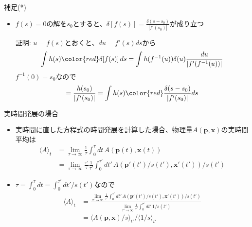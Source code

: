 \begin{frame}[t,fragile]{補足(*)}
  \begin{itemize}
  \item $f(s)=0$の解を$s_0$とすると、$\displaystyle \delta [f(s)] = \frac{\delta(s-s_0)}{|f'(s_0)|}$が成り立つ

    証明: $u=f(s)$とおくと、$du = f'(s)ds$から
    \begin{align*}
      \int h(s) {\color{red}\delta [f(s)]} \, ds= \int h(f^{-1}(u)) \delta(u) \frac{du}{|f'(f^{-1}(u))|}
    \end{align*}
    $f^{-1}(0)=s_0$なので
    \begin{align*}
      = \frac{h(s_0)}{|f'(s_0)|} = \int h(s) {\color{red}\frac{\delta(s-s_0)}{|f'(s_0)|}} ds
    \end{align*}
  \end{itemize}
\end{frame}

\begin{frame}[t,fragile]{実時間発展の場合}
  \begin{itemize}
  \item 実時間に直した方程式の時間発展を計算した場合、物理量$A(\mathbf{p},\mathbf{x})$の実時間平均は
    \begin{align*}
      \langle A \rangle_t &= \lim_{\tau\rightarrow\infty} \frac{1}{\tau} \int_0^\tau dt \, A(\mathbf{p}(t),\mathbf{x}(t)) \\
      &= \lim_{\tau\rightarrow\infty} \frac{\tau'}{\tau} \frac{1}{\tau'} \int_0^{\tau'} dt' \, A(\mathbf{p}'(t')/s(t'),\mathbf{x}'(t')) / s(t')
    \end{align*}
  \item $\tau = \int_0^{\tau} dt = \int_0^{\tau'} dt'/s(t')$なので
    \begin{align*}
      \langle A \rangle_t &= \frac{\lim_{\tau'\rightarrow\infty} \frac{1}{\tau'} \int_0^{\tau'} dt' \, A(\mathbf{p}'(t')/s(t'),\mathbf{x}'(t')) / s(t')}{\lim_{\tau'\rightarrow\infty} \frac{1}{\tau'} \int_0^{\tau'} dt' \, 1/ s(t')} \\
      &= \langle A(\mathbf{p},\mathbf{x}) / s \rangle_{t'} / \langle 1 / s \rangle_{t'}
    \end{align*}
  \end{itemize}
\end{frame}

